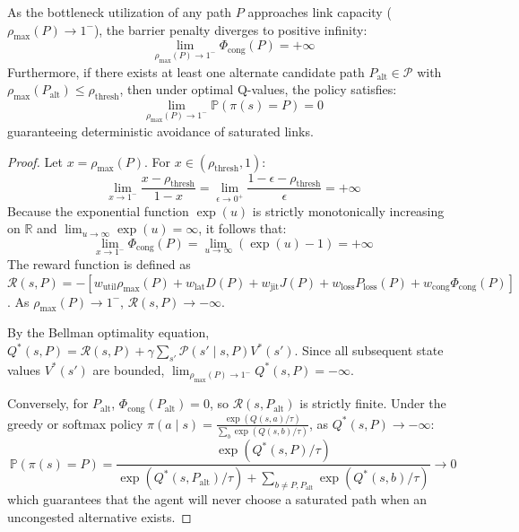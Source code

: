 \begin{theorem}
As the bottleneck utilization of any path $P$ approaches link capacity ($\rho_{\max}(P) \to 1^-$), the barrier penalty diverges to positive infinity:
\begin{equation}
    \lim_{\rho_{\max}(P) \to 1^-} \Phi_{\text{cong}}(P) = +\infty
\end{equation}
Furthermore, if there exists at least one alternate candidate path $P_{\text{alt}} \in \mathcal{P}$ with $\rho_{\max}(P_{\text{alt}}) \le \rho_{\text{thresh}}$, then under optimal Q-values, the policy satisfies:
\begin{equation}
    \lim_{\rho_{\max}(P) \to 1^-} \mathbb{P}\left(\pi(s) = P\right) = 0
\end{equation}
guaranteeing deterministic avoidance of saturated links.
\end{theorem}

\begin{proof}
Let $x = \rho_{\max}(P)$. For $x \in (\rho_{\text{thresh}}, 1)$:
\begin{equation}
    \lim_{x \to 1^-} \frac{x - \rho_{\text{thresh}}}{1 - x} = \lim_{\epsilon \to 0^+} \frac{1 - \epsilon - \rho_{\text{thresh}}}{\epsilon} = +\infty
\end{equation}
Because the exponential function $\exp(u)$ is strictly monotonically increasing on $\mathbb{R}$ and $\lim_{u \to \infty} \exp(u) = \infty$, it follows that:
\begin{equation}
    \lim_{x \to 1^-} \Phi_{\text{cong}}(P) = \lim_{u \to \infty} (\exp(u) - 1) = +\infty
\end{equation}
The reward function is defined as $\mathcal{R}(s, P) = - [w_{\text{util}} \rho_{\max}(P) + w_{\text{lat}} D(P) + w_{\text{jit}} J(P) + w_{\text{loss}} P_{\text{loss}}(P) + w_{\text{cong}} \Phi_{\text{cong}}(P)]$. As $\rho_{\max}(P) \to 1^-$, $\mathcal{R}(s, P) \to -\infty$.

By the Bellman optimality equation, $Q^*(s, P) = \mathcal{R}(s, P) + \gamma \sum_{s'} \mathcal{P}(s' \mid s, P) V^*(s')$. Since all subsequent state values $V^*(s')$ are bounded, $\lim_{\rho_{\max}(P) \to 1^-} Q^*(s, P) = -\infty$.

Conversely, for $P_{\text{alt}}$, $\Phi_{\text{cong}}(P_{\text{alt}}) = 0$, so $\mathcal{R}(s, P_{\text{alt}})$ is strictly finite. Under the greedy or softmax policy $\pi(a \mid s) = \frac{\exp(Q(s, a)/\tau)}{\sum_{b} \exp(Q(s, b)/\tau)}$, as $Q^*(s, P) \to -\infty$:
\begin{equation}
    \mathbb{P}\left(\pi(s) = P\right) = \frac{\exp(Q^*(s, P)/\tau)}{\exp(Q^*(s, P_{\text{alt}})/\tau) + \sum_{b \ne P, P_{\text{alt}}} \exp(Q^*(s, b)/\tau)} \to 0
\end{equation}
which guarantees that the agent will never choose a saturated path when an uncongested alternative exists.
\end{proof}

